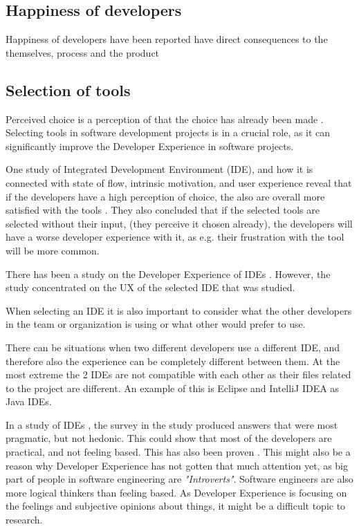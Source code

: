 \documentclass[english, 12pt, a4paper, sci, utf8, a-1b, online]{aaltothesis}
\begin{document}

\subsection{Happiness of developers}

Happiness of developers have been reported have direct consequences to the themselves, process and the product \citep{unhappy-developers}

\subsection{Selection of tools}

Perceived choice is a perception of that the choice has already been made \citep{kuusinen-flow}. Selecting tools in software development projects is in a crucial role, as it can significantly improve the Developer Experience in software projects.

One study of Integrated Development Environment (IDE), and how it is connected with state of flow, intrinsic motivation, and user experience reveal that if the developers have a high perception of choice, the also are overall more satisfied with the tools \citep{kuusinen-flow}. They also concluded that if the selected tools are selected without their input, (they perceive it chosen already), the developers will have a worse developer experience with it, as e.g. their frustration with the tool will be more common.

There has been a study on the Developer Experience of IDEs \citep{software-developers-as-users}. However, the study concentrated on the UX of the selected IDE that was studied.

When selecting an IDE it is also important to consider what the other developers in the team or organization is using or what other would prefer to use.

There can be situations when two different developers use a different IDE, and therefore also the experience can be completely different between them. At the most extreme the 2 IDEs are not compatible with each other as their files related to the project are different. An example of this is Eclipse and IntelliJ IDEA as Java IDEs.

In a study of IDEs \citep{software-developers-as-users}, the survey in the study produced answers that were most pragmatic, but not hedonic. This could show that most of the developers are practical, and not feeling based. This has also been proven \citep{personality-software}. This might also be a reason why Developer Experience has not gotten that much attention yet, as big part of people in software engineering are \textit{"Introverts"}. Software engineers are also more logical thinkers than feeling based. As Developer Experience is focusing on the feelings and subjective opinions about things, it might be a difficult topic to research.
\end{document}
